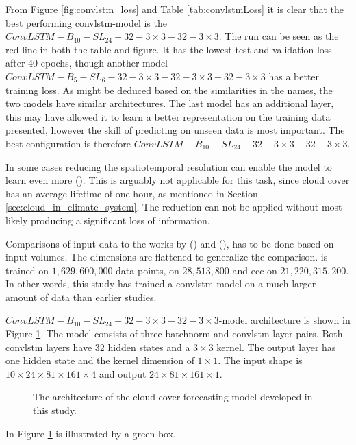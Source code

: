 
From Figure \ref{fig:convlstm_loss} and Table \ref{tab:convlstmLoss}  it is clear that the best performing \acrshort{convlstm}-model is the $ConvLSTM-B_{10}-SL_{24}-32-3\times3-32-3 \times3$. The run can be seen as the red line in both the table and figure. It has the lowest test and validation loss after 40 epochs, though another model $ConvLSTM-B_{5}-SL_{6}-32-3\times3-32-3 \times3-32-3 \times3$ has a better training loss. As might be deduced based on the similarities in the names, the two models have similar architectures.
The last model has an additional layer, this may have allowed it to learn a better representation on the training data presented, however the skill of predicting on unseen data is most important. The best configuration is therefore $ConvLSTM-B_{10}-SL_{24}-32-3\times3-32-3 \times3$.

In some cases reducing the spatiotemporal resolution can enable the model to learn even more (\cite{precip_nowcasting}). This is arguably not applicable for this task, since cloud cover has an average lifetime of one hour, as mentioned in Section \ref{sec:cloud_in_climate_system}. The reduction can not be applied without most likely producing a significant loss of information.

Comparisons of input data to the works by \citeauthor{precip_nowcasting} (\citeyear{precip_nowcasting}) and \citeauthor{SunAirLSTM} (\citeyear{SunAirLSTM}), has to be done based on input volumes. The dimensions are flattened to generalize the comparison.  is trained on $1,629,600,000$ data points,  on $28,513,800$ and \acrshort{ecc} on $21,220,315,200$. %
In other words,  this study has trained a \acrshort{convlstm}-model on a much larger amount of data than earlier studies. %

$ConvLSTM-B_{10}-SL_{24}-32-3\times3-32-3 \times3$-model architecture is shown in Figure \ref{fig:best_ml_architecture}. The model consists of three \acrshort{batchnorm} and  \acrshort{convlstm}-layer pairs. Both \acrshort{convlstm} layers have 32 hidden states and a $3\times 3$ kernel. The output layer has one hidden state and the kernel dimension of $1\times 1$. The input shape is $10\times24\times81\times161\times4$ and output $24\times81\times161\times1$. 
\begin{figure}
    \centering
    
    \caption{The architecture of the cloud cover forecasting model developed in this study.}
    \label{fig:best_ml_architecture}
\end{figure}
In Figure \ref{fig:best_ml_architecture} is illustrated by a green box. 


